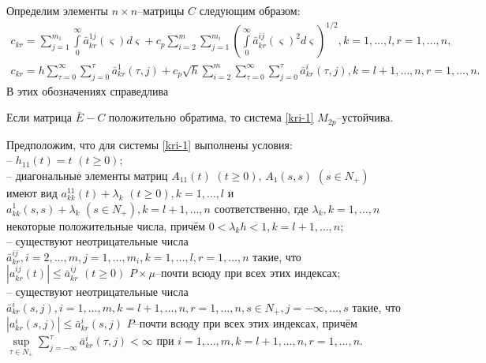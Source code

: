 Определим элементы $n\times n$--матрицы $C$ следующим образом:
$$
\begin{array}{crl}
c_{kr} = \sum \limits_{j=1}^{m_1}\int \limits _0^{\infty } \bar
a^{1j}_{kr}(\varsigma)d\varsigma + c_p \sum \limits_{i=2}^m \sum
\limits_{j=1}^{m_i}\left(\int \limits _0^{\infty } \bar
a^{ij}_{kr}(\varsigma )^2d\varsigma \right)^{1/2},  k
= 1, \dots ,l, r = 1, \dots, n,\\
c_{kr} = h\sum \limits _{\tau=0 }^{\infty }\sum \limits _{j=0
}^{\tau}\bar a^{1}_{kr}(\tau,j) + c_p \sqrt{h}\sum \limits
_{i=2}^{m}\sum \limits _{\tau=0 }^{\infty }\sum \limits _{j=0
}^{\tau} \bar a^{i}_{kr}(\tau,j), k = l+1, \dots,n, r = 1, \dots, n.
\end{array}
$$
В этих обозначениях справедлива

\begin{theorem}\label{kri-th3} Если матрица $\bar E - C$ положительно
обратима, то система \eqref{kri-1} $M_{2p}$--устой\-чи\-ва.
\end{theorem}

Предположим, что для системы \eqref{kri-1}
выполнены условия:\\
\noindent
  -- $h_{11}(t) = t \,\,
(t \geq 0)$;\\
  -- диагональные элементы матриц $A_{11}(t)\,\, (t \geq
0)$, $A_1(s,s) \,\, (s \in N_+)$ имеют вид $a_{kk}^{11}(t) + \lambda
_k \,\, (t \geq 0), k=1, \dots, l$ и $a_{kk}^{1}(s,s) + \lambda _k
\,\, (s \in N_+), k=l + 1, \dots, n$ соответственно, где $\lambda _k,
k = 1, \dots, n$ некоторые положительные числа, причём $0 < \lambda
_kh < 1, k = l + 1, \dots, n$;\\
  -- существуют  неотрицательные числа  $\bar
a^{ij}_{kr}, i = 2,\dots,m, j = 1,\dots,m_i, k =1,\dots,l, r = 1,\dots,n$
 такие, что $|a^{ij}_{kr}(t)|\leq \bar
a^{ij}_{kr} \,\, (t\geq 0) $ $P\times\mu$--почти всюду при всех этих
индексах;\\
  -- существуют  неотрицательные числа
$\bar a^i_{kr}(s,j),i=1,\dots,m, k = l+1, \dots, n, r = 1,\dots,n, s\in
N_+, j=-\infty,\dots,s$ такие, что  $|a^i_{kr}(s,j)| \leq \bar
a^i_{kr}(s,j)$ $P$--почти всюду при всех этих индексах, причём $
\mathrel {\mathop {\sup} \limits _{\tau \in N_+ }} \sum \limits
_{j=-\infty }^{\tau}\bar a^{i}_{kr}(\tau,j) < \infty$ при
$i=1,\dots,m, k = l+1, \dots, n, r = 1,\dots,n$.

